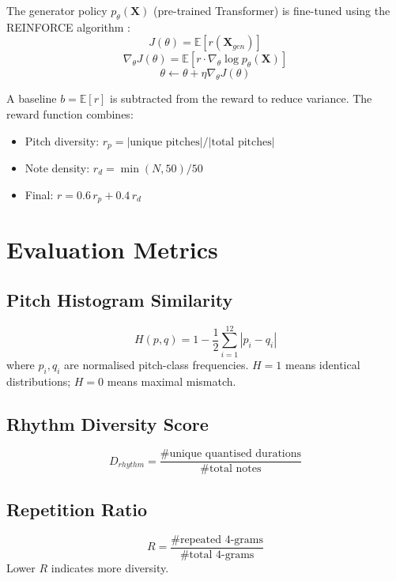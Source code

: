 \documentclass[conference]{IEEEtran}
\begin{document}
The generator policy $p_\theta(\mathbf{X})$ (pre-trained
Transformer) is fine-tuned using the REINFORCE algorithm
\cite{williams1992reinforce}:
\begin{equation}
J(\theta) = \mathbb{E}\left[r(\mathbf{X}_{gen})\right]
\end{equation}
\begin{equation}
\nabla_\theta J(\theta) = \mathbb{E}\left[r \cdot
\nabla_\theta \log p_\theta(\mathbf{X})\right]
\end{equation}
\begin{equation}
\theta \leftarrow \theta + \eta \nabla_\theta J(\theta)
\end{equation}

A baseline $b = \mathbb{E}[r]$ is subtracted from the reward to
reduce variance. The reward function combines:
\begin{itemize}
\item Pitch diversity: $r_p = |\text{unique pitches}|/|\text{total pitches}|$
\item Note density: $r_d = \min(N, 50)/50$
\item Final: $r = 0.6\,r_p + 0.4\,r_d$
\end{itemize}

\section{Evaluation Metrics}

\subsection{Pitch Histogram Similarity}
\begin{equation}
H(p, q) = 1 - \frac{1}{2}\sum_{i=1}^{12}|p_i - q_i|
\end{equation}
where $p_i, q_i$ are normalised pitch-class frequencies.
$H = 1$ means identical distributions; $H = 0$ means maximal mismatch.

\subsection{Rhythm Diversity Score}
\begin{equation}
D_{rhythm} = \frac{\#\text{unique quantised durations}}{\#\text{total notes}}
\end{equation}

\subsection{Repetition Ratio}
\begin{equation}
R = \frac{\#\text{repeated 4-grams}}{\#\text{total 4-grams}}
\end{equation}
Lower $R$ indicates more diversity.
\end{document}
